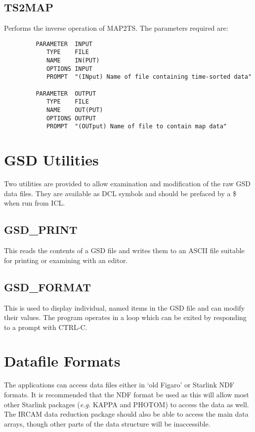 \newpage    %

\subsection{TS2MAP}

Performs the inverse operation of MAP2TS. The parameters required are:

\begin{small}
\begin{verbatim}
         PARAMETER  INPUT
            TYPE    FILE
            NAME    IN(PUT)
            OPTIONS INPUT
            PROMPT  "(INput) Name of file containing time-sorted data"

         PARAMETER  OUTPUT
            TYPE    FILE
            NAME    OUT(PUT)
            OPTIONS OUTPUT
            PROMPT  "(OUTput) Name of file to contain map data"
\end{verbatim}
\end{small}

\section{GSD Utilities}

Two utilities are provided to allow examination and  modification of
the raw GSD data files. They are available as DCL symbols and should
be prefaced by a \$ when run from ICL.

\subsection{GSD\_PRINT}

This reads the contents of a GSD file and writes them to an ASCII file
suitable for printing or examining with an editor.

\subsection{GSD\_FORMAT}

This is used to display individual, named items in the GSD file and
can modify their values. The program operates in a loop which can be
exited by responding to a prompt with CTRL-C.

\section{Datafile Formats}
\label{sec-data}

The applications can access data files either in `old Figaro' or
Starlink  NDF formats. It is recommended that the NDF format be used
as this will allow most other Starlink packages ({\em e.g.} KAPPA and
PHOTOM) to access the data as well. The IRCAM data reduction package
should also be able to access the main data arrays, though other parts
of the data structure will be inaccessible.

